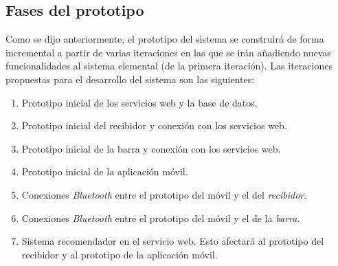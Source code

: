   \subsection{Fases del prototipo}
Como se dijo anteriormente, el prototipo del sistema se construirá de forma
incremental a partir de varias iteraciones en las que se irán añadiendo
nuevas funcionalidades al sistema elemental (de la primera iteración). Las
iteraciones propuestas para el desarrollo del sistema son las siguientes:
\begin{enumerate}
\item Prototipo inicial de los servicios web y la base de datos.
\item Prototipo inicial del recibidor y conexión con los servicios web.
\item Prototipo inicial de la barra y conexión con los servicios web.
\item Prototipo inicial de la aplicación móvil.
\item Conexiones \emph{Bluetooth} entre el prototipo del móvil y el del
\emph{recibidor}.
\item Conexiones \emph{Bluetooth} entre el prototipo del móvil y el de la
\emph{barra}.
\item Sistema recomendador en el servicio web. Esto afectará al prototipo del 
recibidor y al prototipo de la aplicación móvil.
\end{enumerate}


